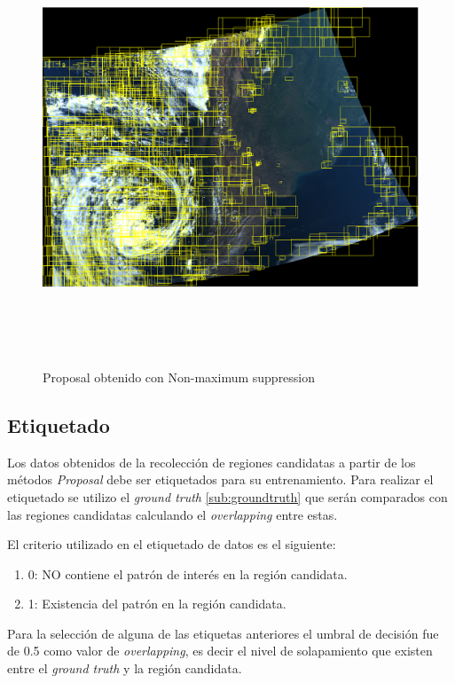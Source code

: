 \begin{figure}[H]
 \centering
  \includegraphics[height=13cm,keepaspectratio=true,clip=true]{imagenes/Logos/proposalconNMS.png}
  \caption{Proposal obtenido con Non-maximum suppression}
	\label{Fig: proposalnms}
\end{figure}


\subsection{Etiquetado}\label{sub:etiquetado}

Los datos obtenidos de la recolección de regiones candidatas a partir de los métodos \textit{Proposal} debe ser etiquetados para su entrenamiento. Para realizar el etiquetado se utilizo el \textit{ground truth} \ref{sub:groundtruth} que serán comparados con las regiones candidatas calculando el \textit{overlapping} entre estas.

El criterio utilizado en el etiquetado de datos es el siguiente:
\begin{enumerate}
	\item 0: NO contiene el patrón de interés en la región candidata.
	\item 1: Existencia del patrón en la región candidata.
\end{enumerate}

Para la selección de alguna de las etiquetas anteriores el umbral de decisión fue de 0.5 como valor de \textit{overlapping}, es decir el nivel de solapamiento que existen entre el \textit{ground truth} y la región candidata.


